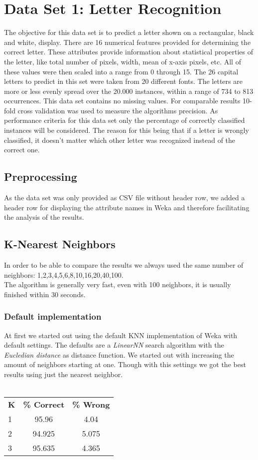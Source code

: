 \documentclass{article}
\begin{document}
\section{Data Set 1: Letter Recognition}
The objective for this data set is to predict a letter shown on a rectangular, black and white, display. There are 16 numerical features  provided for determining the correct letter. These attributes provide information about statistical properties of the letter, like total number of pixels, width, mean of x-axis pixels, etc.
All of these values were then scaled into a range from 0 through 15. The 26 capital letters to predict in this set were taken from 20 different fonts. The letters are more or less evenly spread over the 20.000 instances, within a range of 734 to 813 occurrences. This data set contains no missing values. For comparable results 10-fold cross validation was used to measure the algorithms precision.
As performance criteria for this data set only the percentage of correctly classified instances will be considered. The reason for this being that if a letter is wrongly classified, it doesn't matter which other letter was recognized instead of the correct one. 
\\
\subsection{Preprocessing}
As the data set was only provided as CSV file without header row, we added a header row for displaying the attribute names in Weka and therefore facilitating the analysis of the results. 
\\
\subsection{K-Nearest Neighbors}
In order to be able to compare the results we always used the same number of neighbors: 1,2,3,4,5,6,8,10,16,20,40,100.\\
The algorithm is generally very fast, even with 100 neighbors, it is usually finished within 30 seconds. 
\subsubsection{Default implementation}
At first we started out using the default KNN implementation of Weka with default settings. The defaults are a \emph{LinearNN} search algorithm with the \emph{Eucledian distance} as distance function. We started out with increasing the amount of neighbors starting at one. Though with this settings we got the best results using just the nearest neighbor. 
\\\\
\begin{center}
\begin{tabular}{ l | c |c }
\textbf{K} & \textbf{\% Correct} & \textbf{\% Wrong} \\
1 & 95.96 & 4.04 \\
2 & 94.925 & 5.075 \\
3 & 95.635 & 4.365 \\
\end{tabular}
\end{center}
\end{document}
